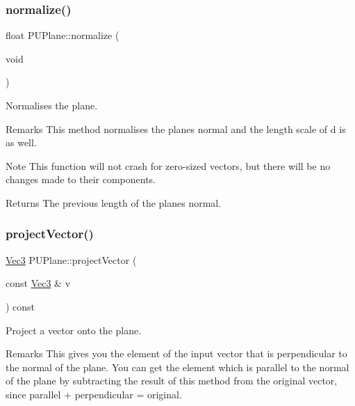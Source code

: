\subsubsection{\texorpdfstring{normalize()}{normalize()}\hspace{0.1cm}{\footnotesize\ttfamily [2/2]}}
{\footnotesize\ttfamily float P\+U\+Plane\+::normalize (\begin{DoxyParamCaption}\item[{void}]{ }\end{DoxyParamCaption})}

Normalises the plane. \begin{DoxyRemark}{Remarks}
This method normalises the plane\textquotesingle{}s normal and the length scale of d is as well. 
\end{DoxyRemark}
\begin{DoxyNote}{Note}
This function will not crash for zero-\/sized vectors, but there will be no changes made to their components. 
\end{DoxyNote}
\begin{DoxyReturn}{Returns}
The previous length of the plane\textquotesingle{}s normal. 
\end{DoxyReturn}
\mbox{\label{classPUPlane_a7e389950f054b35612eeb8d03651fffe}} 
\subsubsection{\texorpdfstring{project\+Vector()}{projectVector()}\hspace{0.1cm}{\footnotesize\ttfamily [1/2]}}
{\footnotesize\ttfamily \hyperlink{classVec3}{Vec3} P\+U\+Plane\+::project\+Vector (\begin{DoxyParamCaption}\item[{const \hyperlink{classVec3}{Vec3} \&}]{v }\end{DoxyParamCaption}) const}

Project a vector onto the plane. \begin{DoxyRemark}{Remarks}
This gives you the element of the input vector that is perpendicular to the normal of the plane. You can get the element which is parallel to the normal of the plane by subtracting the result of this method from the original vector, since parallel + perpendicular = original. 
\end{DoxyRemark}

